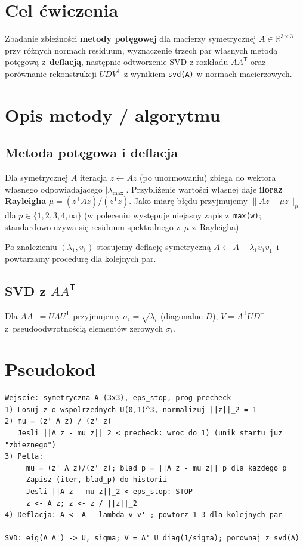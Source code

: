 \documentclass[polish]{template/projectreport}
\begin{document}
\section{Cel ćwiczenia}
Zbadanie zbieżności \textbf{metody potęgowej} dla macierzy symetrycznej $A\in\mathbb{R}^{3\times 3}$ przy różnych
normach residuum, wyznaczenie trzech par własnych metodą potęgową z~\textbf{deflacją}, następnie odtworzenie SVD
z rozkładu $AA^{\mathsf{T}}$ oraz porównanie rekonstrukcji $UDV^{\mathsf{T}}$ z wynikiem \texttt{svd(A)} w normach macierzowych.

\section{Opis metody / algorytmu}
\subsection{Metoda potęgowa i deflacja}
Dla symetrycznej $A$ iteracja $z\leftarrow Az$ (po unormowaniu) zbiega do wektora własnego odpowiadającego
$|\lambda_{\max}|$. Przybliżenie wartości własnej daje \textbf{iloraz Rayleigha} $\mu=(z^{\mathsf{T}}Az)/(z^{\mathsf{T}}z)$.
Jako miarę błędu przyjmujemy $\|Az-\mu z\|_p$ dla $p\in\{1,2,3,4,\infty\}$ (w poleceniu występuje niejasny zapis
z~\texttt{max(w)}; standardowo używa się residuum spektralnego z~$\mu$ z~Rayleigha).

Po znalezieniu $(\lambda_1,v_1)$ stosujemy deflację symetryczną $A\leftarrow A-\lambda_1 v_1 v_1^{\mathsf{T}}$ i powtarzamy
procedurę dla kolejnych par.

\subsection{SVD z $AA^{\mathsf{T}}$}
Dla $AA^{\mathsf{T}}=U\Lambda U^{\mathsf{T}}$ przyjmujemy $\sigma_i=\sqrt{\lambda_i}$ (diagonalne $D$),
$V=A^{\mathsf{T}}U D^{+}$ z~pseudoodwrotnością elementów zerowych $\sigma_i$.

\section{Pseudokod}
\begin{verbatim}
Wejscie: symetryczna A (3x3), eps_stop, prog precheck
1) Losuj z o wspolrzednych U(0,1)^3, normalizuj ||z||_2 = 1
2) mu = (z' A z) / (z' z)
   Jesli ||A z - mu z||_2 < precheck: wroc do 1) (unik startu juz "zbieznego")
3) Petla:
     mu = (z' A z)/(z' z); blad_p = ||A z - mu z||_p dla kazdego p
     Zapisz (iter, blad_p) do historii
     Jesli ||A z - mu z||_2 < eps_stop: STOP
     z <- A z; z <- z / ||z||_2
4) Deflacja: A <- A - lambda v v' ; powtorz 1-3 dla kolejnych par

SVD: eig(A A') -> U, sigma; V = A' U diag(1/sigma); porownaj z svd(A)
\end{verbatim}
\end{document}
